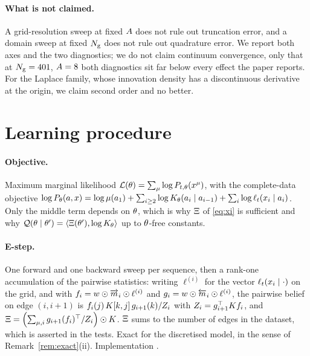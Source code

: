 \paragraph{What is not claimed.} A grid-resolution sweep at fixed $A$ does not rule out
truncation error, and a domain sweep at fixed $N_{\mathrm{g}}$ does not rule out quadrature error. We
report both axes and the two diagnostics; we do not claim continuum convergence, only that at
$N_{\mathrm{g}}=401$, $A=8$ both diagnostics sit far below every effect the paper reports.
For the Laplace family, whose innovation density has a discontinuous derivative at the origin, we
claim second order and no better.

\section{Learning procedure}
\label{app:learning}

\paragraph{Objective.} Maximum marginal likelihood
$\mathcal{L}(\theta) = \sum_\mu\log P_{t,\theta}(x^\mu)$, with the complete-data objective
$\log P_\theta(a,x) = \log\mu(a_1) + \sum_{i\ge2}\log K_{\theta}(a_i\mid a_{i-1}) +
\sum_i\log\ell_t(x_i\mid a_i)$. Only the middle term depends on $\theta$, which is why $\Xi$ of
\eqref{eq:xi} is sufficient and why $\mathcal{Q}(\theta\mid\theta') = \langle\Xi(\theta'),
\log K_{\theta}\rangle$ up to $\theta$-free constants.

\paragraph{E-step.} One forward and one backward sweep per sequence, then a rank-one accumulation
of the pairwise statistics: writing $\ell^{(i)}$ for the vector $\ell_t(x_i\mid \cdot)$ on the
grid, and with $f_i = w\odot\overrightarrow{m}_i\odot\ell^{(i)}$ and $g_i = w\odot\overleftarrow{m}_i\odot\ell^{(i)}$,
the pairwise belief on edge $(i,i+1)$ is
$f_i(j)\,K[k,j]\,g_{i+1}(k)/Z_i$ with $Z_i = g_{i+1}^\top K f_i$, and
$\Xi = \left(\sum_{\mu,i} g_{i+1}(f_i)^\top/Z_i\right)\odot K$. $\Xi$ sums to the number
of edges in the dataset, which is asserted in the tests. Exact for the discretised model, in the
sense of Remark~\ref{rem:exact}(ii). Implementation .

